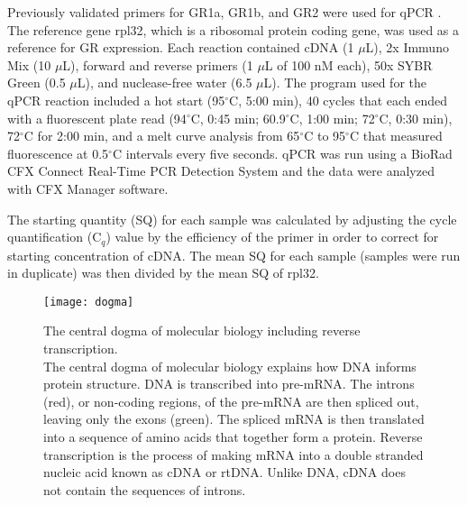 \documentclass[12pt,twoside]{reedthesis}
\begin{document}
Previously validated primers for GR1a, GR1b, and GR2 were used for qPCR \citep{solomon-lane_early-life_2018}. The
reference gene rpl32, which is a ribosomal protein coding gene, was used as a
reference for GR expression. Each reaction contained cDNA (1 $\mu$L), 2x Immuno Mix (10 $\mu$L),
forward and reverse primers (1 $\mu$L of 100 nM each), 50x SYBR Green (0.5
$\mu$L), and nuclease-free water (6.5 $\mu$L). The program used for the qPCR
reaction included a hot start (95$^\circ$C, 5:00 min), 40 cycles that each
ended with a fluorescent plate read (94$^\circ$C, 0:45 min; 60.9$^\circ$C, 1:00
min; 72$^\circ$C, 0:30 min), 72$^\circ$C for 2:00 min, and a melt curve analysis from 65$^\circ$C to
95$^\circ$C that measured fluorescence at 0.5$^\circ$C intervals every five
seconds. qPCR was run using a BioRad CFX Connect Real-Time PCR Detection System
and the data were analyzed with CFX Manager software.

The starting quantity (SQ) for each sample was calculated by adjusting the cycle
quantification (C$_{q}$)
value by the efficiency of the primer in order to
correct for starting concentration of cDNA. The 
mean SQ for each sample (samples were run in duplicate) was then divided by the mean SQ
of rpl32.

\begin{figure}[htbp] 
\begin{center} 
\texttt{[image: dogma]}
\caption[The central dogma of molecular biology including reverse transcription]{\footnotesize{The
    central dogma of molecular biology including reverse transcription. \\ The
    central dogma of molecular biology explains how DNA informs protein
    structure. DNA is transcribed into pre-mRNA. The introns (red), or non-coding
    regions, of the pre-mRNA are then spliced out, leaving only the exons
    (green). The spliced mRNA is then translated into a sequence of amino acids
    that together form a protein. Reverse transcription is the process of making
  mRNA into a double stranded nucleic acid known as cDNA or rtDNA. Unlike DNA, cDNA
  does not contain the sequences of introns.}} 
\label{subd}
\end{center} 
\end{figure}
\end{document}
